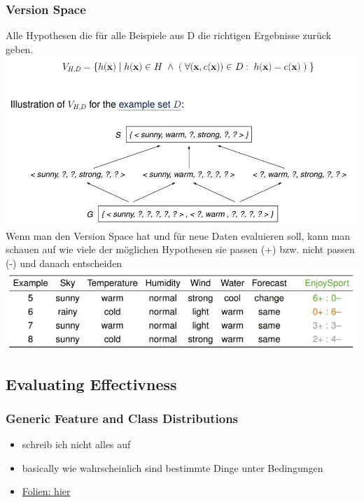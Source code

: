 \documentclass[11pt,a4paper]{article}
\begin{document}
\begin{flushleft}
\subsubsection{Version Space}
Alle Hypothesen die für alle Beispiele aus D die richtigen Ergebnisse zurück geben.
\includegraphics[width=\textwidth]{VersionSpace}
Wenn man den Version Space hat und für neue Daten evaluieren soll, kann man schauen auf wie viele der möglichen Hypothesen sie passen (+) bzw. nicht passen (-) und danach entscheiden
\includegraphics[width=\textwidth]{VSBeispiel}

\subsection{Evaluating Effectivness}
\subsubsection{Generic Feature and Class Distributions}
\begin{itemize}
\item schreib ich nicht alles auf
\item basically wie wahrscheinlich sind bestimmte Dinge unter Bedingungen
\item \href{https://webis.de/downloads/lecturenotes/machine-learning/unit-en-evaluating-effectiveness.pdf}{Folien: hier}
\end{itemize}

\end{flushleft}
\end{document}
